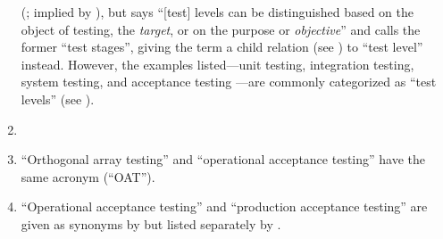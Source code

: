\begin{enumerate}
          (\citealpISTQB{}; implied by \citealp[p.~9]{Gerrard2000a}), but
          \citet[p.~5\=/6]{SWEBOK2024} says ``[test] levels can be distinguished
          based on the object of testing, the \emph{target}, or on the purpose
          or \emph{objective}'' and calls the former ``test stages'', giving
          the term a child relation (see ) to ``test level''
          instead. However, the examples listed---unit testing, integration
          testing, system testing, and acceptance testing
          \citep[pp.~5\=/6 to 5\=/7]{SWEBOK2024}---are commonly categorized as
          ``test levels'' (see ).
    \item %
          \tolTestFlaw{}
    \item %
          ``Orthogonal array testing'' \ifnotpaper \citetext{%
                  \citealp[pp.~5\=/1, 5\=/11]{SWEBOK2024};
                  implied by \citealp[pp.~467, 473]{Valcheva2013};
                  \citealp[pp.~1573\==1577, 1580]{YuEtAl2011}} \else
              \cite[pp.~5\=/1, 5\=/11]{SWEBOK2024} \fi and ``operational
          acceptance testing'' \citep[p.~30]{Firesmith2015} have the same
          acronym (``OAT'').
    \item %
          ``Operational acceptance testing'' and ``production acceptance
          testing'' are given as synonyms by \citetISTQB{} but listed
          separately by \citet[p.~30]{Firesmith2015}.


\end{enumerate}
